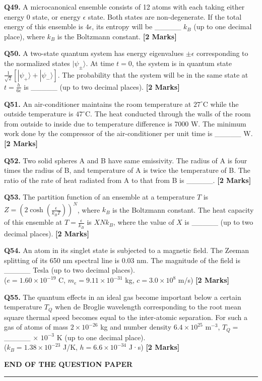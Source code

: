 \documentclass[11pt]{article}
\newcommand{\questionb}[2]{
    \noindent\textbf{Q#2.} #1 \hfill \textbf{[2 Marks]}
}
\begin{document}
\questionb{A microcanonical ensemble consists of 12 atoms with each taking either energy 0 state, or energy \(\epsilon\) state. Both states are non-degenerate. If the total energy of this ensemble is \(4\epsilon\), its entropy will be \_\_\_\_\_ \(k_B\) (up to one decimal place), where \(k_B\) is the Boltzmann constant.}{49}
\vspace{0.5cm}

\questionb{A two-state quantum system has energy eigenvalues \(\pm \epsilon\) corresponding to the normalized states \(|\psi_\pm\rangle\). At time \(t = 0\), the system is in quantum state \(\frac{1}{\sqrt{2}}[|\psi_+\rangle + |\psi_-\rangle]\). The probability that the system will be in the same state at \(t = \frac{h}{6\epsilon}\) is \_\_\_\_\_ (up to two decimal places).}{50}
\vspace{0.5cm}

\questionb{An air-conditioner maintains the room temperature at \(27^\circ\text{C}\) while the outside temperature is \(47^\circ\text{C}\). The heat conducted through the walls of the room from outside to inside due to temperature difference is 7000 W. The minimum work done by the compressor of the air-conditioner per unit time is \_\_\_\_\_ W.}{51}
\vspace{0.5cm}

\questionb{Two solid spheres A and B have same emissivity. The radius of A is four times the radius of B, and temperature of A is twice the temperature of B. The ratio of the rate of heat radiated from A to that from B is \_\_\_\_\_.}{52}
\vspace{0.5cm}

\questionb{The partition function of an ensemble at a temperature \(T\) is \(Z = (2 \cosh(\frac{\epsilon}{k_BT}))^N\), where \(k_B\) is the Boltzmann constant. The heat capacity of this ensemble at \(T = \frac{\epsilon}{k_B}\) is \(X N k_B\), where the value of \(X\) is \_\_\_\_\_ (up to two decimal places).}{53}
\vspace{0.5cm}

\questionb{An atom in its singlet state is subjected to a magnetic field. The Zeeman splitting of its 650 nm spectral line is 0.03 nm. The magnitude of the field is \_\_\_\_\_ Tesla (up to two decimal places). \\
(\(e = 1.60 \times 10^{-19}\) C, \(m_e = 9.11 \times 10^{-31}\) kg, \(c = 3.0 \times 10^8\) m/s)}{54}
\vspace{0.5cm}

\questionb{The quantum effects in an ideal gas become important below a certain temperature \(T_Q\) when de Broglie wavelength corresponding to the root mean square thermal speed becomes equal to the inter-atomic separation. For such a gas of atoms of mass \(2 \times 10^{-26}\) kg and number density \(6.4 \times 10^{25}\) m\(^{-3}\), \(T_Q =\) \_\_\_\_\_ × \(10^{-3}\) K (up to one decimal place). \\
(\(k_B = 1.38 \times 10^{-23}\) J/K, \(h = 6.6 \times 10^{-34}\) J·s)}{55}
\vspace{0.5cm}

\vspace{5cm}
\begin{center}
\textbf{END OF THE QUESTION PAPER}\\
\rule{\textwidth}{0.5pt}
\end{center}
\end{document}
